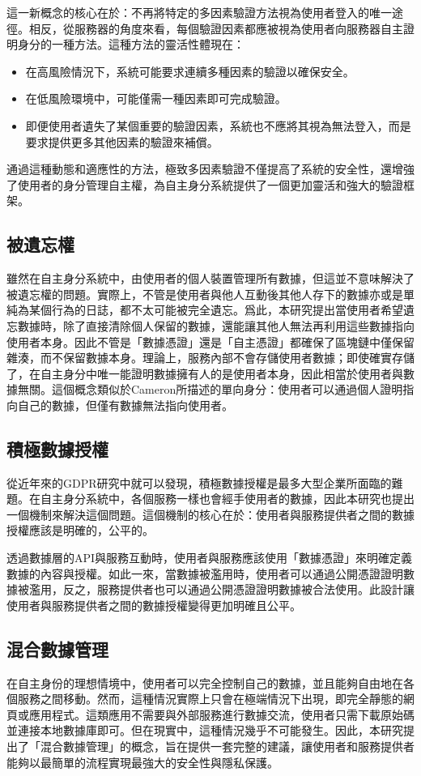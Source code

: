 這一新概念的核心在於：不再將特定的多因素驗證方法視為使用者登入的唯一途徑。相反，從服務器的角度來看，每個驗證因素都應被視為使用者向服務器自主證明身分的一種方法。這種方法的靈活性體現在：
\begin{itemize}
  \item 在高風險情況下，系統可能要求連續多種因素的驗證以確保安全。
  \item 在低風險環境中，可能僅需一種因素即可完成驗證。
  \item 即便使用者遺失了某個重要的驗證因素，系統也不應將其視為無法登入，而是要求提供更多其他因素的驗證來補償。
\end{itemize}
通過這種動態和適應性的方法，極致多因素驗證不僅提高了系統的安全性，還增強了使用者的身分管理自主權，為自主身分系統提供了一個更加靈活和強大的驗證框架。
\subsection{被遺忘權}
雖然在自主身分系統中，由使用者的個人裝置管理所有數據，但這並不意味解決了被遺忘權的問題。實際上，不管是使用者與他人互動後其他人存下的數據亦或是單純為某個行為的日誌，都不太可能被完全遺忘。爲此，本研究提出當使用者希望遺忘數據時，除了直接清除個人保留的數據，還能讓其他人無法再利用這些數據指向使用者本身。因此不管是「數據憑證」還是「自主憑證」都確保了區塊鏈中僅保留雜湊，而不保留數據本身。理論上，服務內部不會存儲使用者數據；即使確實存儲了，在自主身分中唯一能證明數據擁有人的是使用者本身，因此相當於使用者與數據無關。這個概念類似於Cameron\cite{cameron2005laws}所描述的單向身分：使用者可以通過個人證明指向自己的數據，但僅有數據無法指向使用者。
\subsection{積極數據授權}
從近年來的GDPR研究中就可以發現，積極數據授權是最多大型企業所面臨的難題。在自主身分系統中，各個服務一樣也會經手使用者的數據，因此本研究也提出一個機制來解決這個問題。這個機制的核心在於：使用者與服務提供者之間的數據授權應該是明確的，公平的。

透過數據層的API與服務互動時，使用者與服務應該使用「數據憑證」來明確定義數據的內容與授權。如此一來，當數據被濫用時，使用者可以通過公開憑證證明數據被濫用，反之，服務提供者也可以通過公開憑證證明數據被合法使用。此設計讓使用者與服務提供者之間的數據授權變得更加明確且公平。
\subsection{混合數據管理}
在自主身份的理想情境中，使用者可以完全控制自己的數據，並且能夠自由地在各個服務之間移動。然而，這種情況實際上只會在極端情況下出現，即完全靜態的網頁或應用程式。這類應用不需要與外部服務進行數據交流，使用者只需下載原始碼並連接本地數據庫即可。但在現實中，這種情況幾乎不可能發生。因此，本研究提出了「混合數據管理」的概念，旨在提供一套完整的建議，讓使用者和服務提供者能夠以最簡單的流程實現最強大的安全性與隱私保護。

